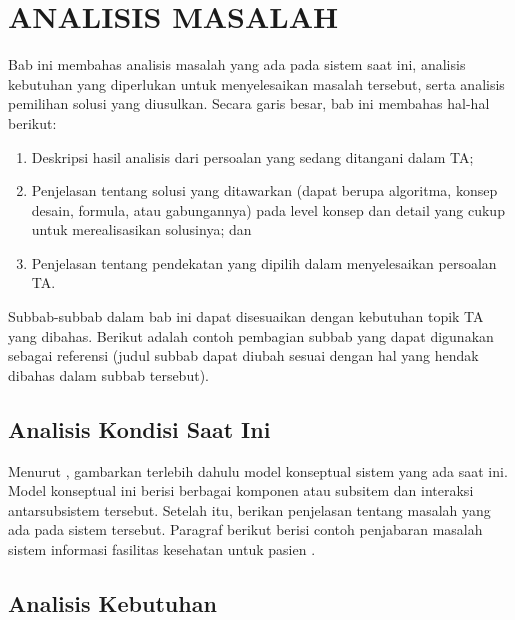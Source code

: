 ﻿\cleardoublepage
\chapter{ANALISIS MASALAH}
\label{chap:analisis-masalah}

\iffalse
Bab ini membahas analisis masalah yang ada pada sistem saat ini, analisis kebutuhan yang diperlukan
untuk menyelesaikan masalah tersebut, serta analisis pemilihan solusi yang diusulkan. Secara garis besar,
bab ini membahas hal-hal berikut:
\begin{enumerate}[1.]
    \item Deskripsi hasil analisis dari persoalan yang sedang ditangani dalam TA;
    \item Penjelasan tentang solusi yang ditawarkan (dapat berupa algoritma, konsep desain, formula, atau gabungannya)
    pada level konsep dan detail yang cukup untuk merealisasikan solusinya; dan
    \item Penjelasan tentang pendekatan yang dipilih dalam menyelesaikan persoalan TA.
\end{enumerate}
Subbab-subbab dalam bab ini dapat disesuaikan dengan kebutuhan topik TA yang dibahas. Berikut adalah contoh pembagian subbab
yang dapat digunakan sebagai referensi (judul subbab dapat diubah sesuai dengan hal yang hendak dibahas dalam subbab tersebut).

\section{Analisis Kondisi Saat Ini}
Menurut \textcite{laudon2020}, gambarkan terlebih dahulu model konseptual sistem yang ada saat ini. Model konseptual ini berisi berbagai komponen atau subsitem dan interaksi antarsubsistem tersebut. Setelah itu, berikan penjelasan tentang masalah yang ada pada sistem tersebut. Paragraf berikut berisi contoh penjabaran masalah sistem informasi fasilitas kesehatan untuk pasien \autocite{pressman2019}.
\section{Analisis Kebutuhan}
\lipsum[4]
